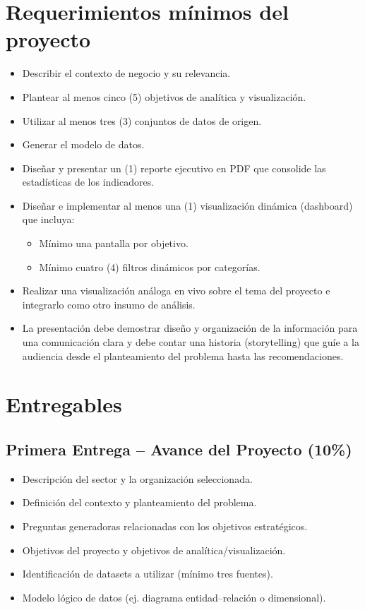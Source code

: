 \documentclass[12pt, spanish]{article}
\begin{document}
\section*{Requerimientos mínimos del proyecto}
\begin{itemize}
    \item Describir el contexto de negocio y su relevancia.
    \item Plantear al menos cinco (5) objetivos de analítica y visualización.
    \item Utilizar al menos tres (3) conjuntos de datos de origen.
    \item Generar el modelo de datos.
    \item Diseñar y presentar un (1) reporte ejecutivo en PDF que consolide las estadísticas de los indicadores.
    \item Diseñar e implementar al menos una (1) visualización dinámica (dashboard) que incluya:
    \begin{itemize}
        \item Mínimo una pantalla por objetivo.
        \item Mínimo cuatro (4) filtros dinámicos por categorías.
    \end{itemize}
    \item Realizar una visualización análoga en vivo sobre el tema del proyecto e integrarlo como otro insumo de análisis.
    \item La presentación debe demostrar diseño y organización de la información para una comunicación clara y debe contar una historia (storytelling) que guíe a la audiencia desde el planteamiento del problema hasta las recomendaciones.
\end{itemize}

\section*{Entregables}

\subsection*{Primera Entrega – Avance del Proyecto (10\%)}
\begin{itemize}
    \item Descripción del sector y la organización seleccionada.
    \item Definición del contexto y planteamiento del problema.
    \item Preguntas generadoras relacionadas con los objetivos estratégicos.
    \item Objetivos del proyecto y objetivos de analítica/visualización.
    \item Identificación de datasets a utilizar (mínimo tres fuentes).
    \item Modelo lógico de datos (ej. diagrama entidad–relación o dimensional).
\end{itemize}
\end{document}
